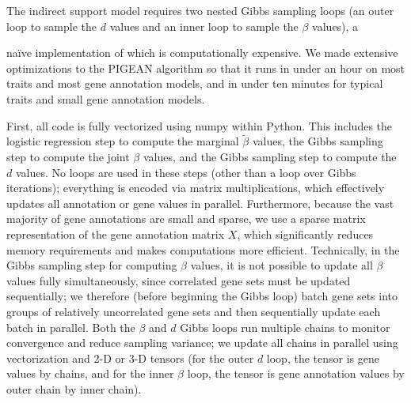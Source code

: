 \documentclass[11pt]{article}
\begin{document}
The indirect support model requires two nested Gibbs sampling loops
(an outer loop to sample the $d$ values and an inner loop to sample
the $\beta$ values), a {na\"ive implementation of which is
computationally expensive. We made extensive optimizations to the
PIGEAN algorithm so that it runs in under an hour on most traits and
most gene annotation models, and in under ten minutes for typical
traits and small gene annotation models. 

First, all code is fully vectorized using numpy within Python. This
includes the logistic regression step to compute the marginal
$\tilde{\beta}$ values, the Gibbs sampling step to compute the joint
$\beta$ values, and the Gibbs sampling step to compute the $d$
values. No loops are used in these steps (other than a loop over Gibbs
iterations); everything is encoded via matrix multiplications, which
effectively updates all annotation or gene values in
parallel. Furthermore, because the vast majority of gene annotations
are small and sparse, we use a sparse matrix representation of the
gene annotation matrix $X$, which significantly reduces memory
requirements and makes computations more efficient. Technically, in
the Gibbs sampling step for computing $\beta$ values, it is not
possible to update all $\beta$ values fully simultaneously, since
correlated gene sets must be updated sequentially; we therefore
(before beginning the Gibbs loop) batch gene sets into groups of
relatively uncorrelated gene sets and then sequentially update each
batch in parallel. Both the $\beta$ and $d$ Gibbs loops run multiple
chains to monitor convergence and reduce sampling variance; we
update all chains in parallel using vectorization and 2-D or 3-D
tensors (for the outer $d$ loop, the tensor is gene values by
chains, and for the inner $\beta$ loop, the tensor is gene annotation
values by outer chain by inner chain). 

}
\end{document}
